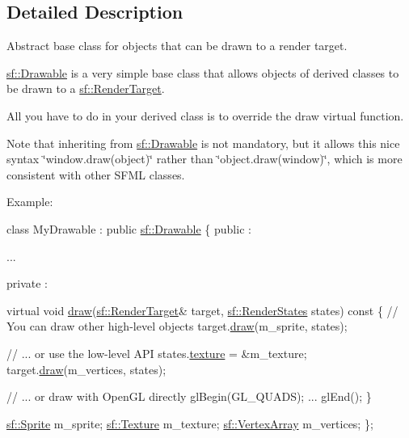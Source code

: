 \subsection{Detailed Description}
Abstract base class for objects that can be drawn to a render target. 

\hyperlink{classsf_1_1_drawable}{sf\+::\+Drawable} is a very simple base class that allows objects of derived classes to be drawn to a \hyperlink{classsf_1_1_render_target}{sf\+::\+Render\+Target}.

All you have to do in your derived class is to override the draw virtual function.

Note that inheriting from \hyperlink{classsf_1_1_drawable}{sf\+::\+Drawable} is not mandatory, but it allows this nice syntax \char`\"{}window.\+draw(object)\char`\"{} rather than \char`\"{}object.\+draw(window)\char`\"{}, which is more consistent with other S\+F\+M\+L classes.

Example\+: 
\begin{DoxyCode}
\textcolor{keyword}{class }MyDrawable : \textcolor{keyword}{public} \hyperlink{classsf_1_1_drawable}{sf::Drawable}
\{
\textcolor{keyword}{public} :

   ...

private :

    \textcolor{keyword}{virtual} \textcolor{keywordtype}{void} \hyperlink{classsf_1_1_drawable_a90d2c88bba9b035a0844eccb380ef631}{draw}(\hyperlink{classsf_1_1_render_target}{sf::RenderTarget}& target, 
      \hyperlink{classsf_1_1_render_states}{sf::RenderStates} states)\textcolor{keyword}{ const}
\textcolor{keyword}{    }\{
        \textcolor{comment}{// You can draw other high-level objects}
        target.\hyperlink{classsf_1_1_render_target_a12417a3bcc245c41d957b29583556f39}{draw}(m\_sprite, states);

        \textcolor{comment}{// ... or use the low-level API}
        states.\hyperlink{classsf_1_1_render_states_a457fc5a41731889de9cf39cf9b3436c3}{texture} = &m\_texture;
        target.\hyperlink{classsf_1_1_render_target_a12417a3bcc245c41d957b29583556f39}{draw}(m\_vertices, states);

        \textcolor{comment}{// ... or draw with OpenGL directly}
        glBegin(GL\_QUADS);
        ...
        glEnd();
    \}

    \hyperlink{classsf_1_1_sprite}{sf::Sprite} m\_sprite;
    \hyperlink{classsf_1_1_texture}{sf::Texture} m\_texture;
    \hyperlink{classsf_1_1_vertex_array}{sf::VertexArray} m\_vertices;
\};
\end{DoxyCode}



